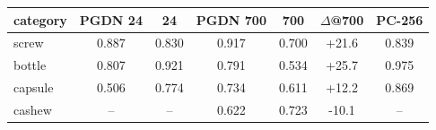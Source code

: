 \setlength{\tabcolsep}{3pt}
\begin{tabular}{@{}lcccccc@{}}
\toprule
category & PGDN 24 & \draem{} 24 & PGDN 700 & \draem{} 700 & $\Delta$@700 & PC-256 \\
\midrule
screw & 0.887 & 0.830 & 0.917 & 0.700 & +21.6 & 0.839 \\
bottle & 0.807 & 0.921 & 0.791 & 0.534 & +25.7 & 0.975 \\
capsule & 0.506 & 0.774 & 0.734 & 0.611 & +12.2 & 0.869 \\
cashew & -- & -- & 0.622 & 0.723 & -10.1 & -- \\
\bottomrule
\end{tabular}
